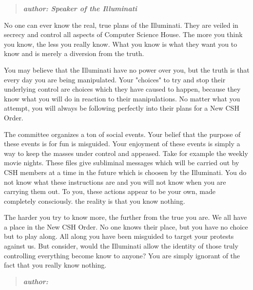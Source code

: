 \documentclass[9pt]{extarticle}
\begin{document}
\begin{minipage}[t]{.61\linewidth} %
\vspace{-0.4cm}
\hypertarget{firstnews}{}
\begin{quote}
\centering
\textbf{\textit{author: Speaker of the Illuminati}}
\end{quote}

No one can ever know the real, true plans of the Illuminati. They are veiled 
in secrecy and control all aspects of Computer Science House. The more you 
think you know, the less you really know. What you know is what they want 
you to know and is merely a diversion from the truth. 

You may believe that the Illuminati have no power over you, but the truth is 
that every day you are being manipulated. Your "choices" to try and stop 
their underlying control are choices which they have caused to happen, because
they know what you will do in reaction to their manipulations. No matter what
you attempt, you will always be following perfectly into their plans for a 
New CSH Order. 

The committee organizes a ton of social events. Your belief that the purpose of
these events is for fun is misguided. Your enjoyment of these events is simply
a way to keep the masses under control and appeased. Take for example the weekly
movie nights. These files give subliminal messages which will be carried out by
CSH members at a time in the future which is choosen by the Illuminati. You
do not know what these instructions are and you will not know when you are
carrying them out. To you, these actions appear to be your own, made completely
consciously. the reality is that you know nothing. 

The harder you try to know more, the further from the true you are. We all have a 
place in the New CSH Order. No one knows their place, but you have no choice 
but to play along. All along you have been misguided to target your protests 
against us. But consider, would the Illuminati allow the identity of those 
truly controlling everything become know to anyone? You are simply ignorant of
the fact that you really know nothing.


\hypertarget{secondnews}{} 
\begin{quote}
\centering
\textbf{\textit{author:  }}
\end{quote}


\end{minipage}
\end{document}
